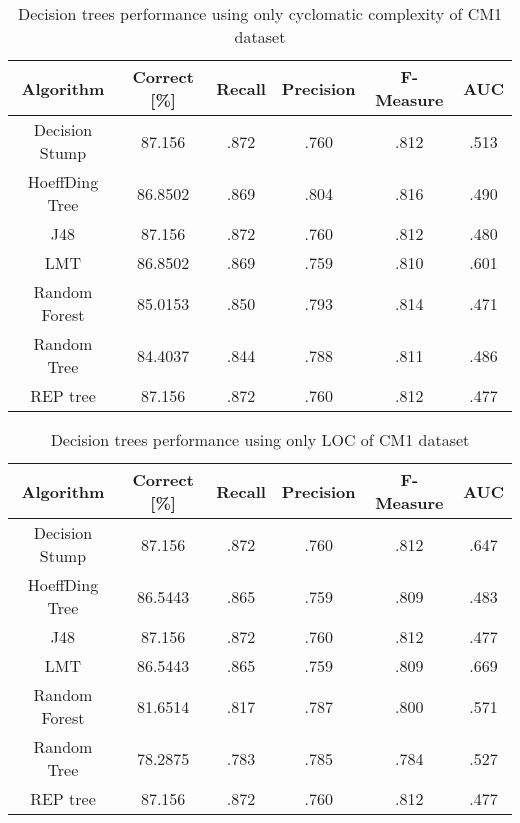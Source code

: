\begin{table}[h!]
\centering
\begin{tabular}{ |c|c|c|c|c|c| } 
 \hline
 \textbf{Algorithm} & \textbf{Correct [\%]} &  \textbf{Recall} & \textbf{Precision} & \textbf{F-Measure} & \textbf{AUC}  \\ 
 \hline
 Decision Stump & \textcolor{myRed}{87.156} & \textcolor{myRed}{.872} & .760 & .812 & .513    \\ 
 \hline
 HoeffDing Tree & 86.8502 & .869 & \textcolor{myRed}{.804} & \textcolor{myRed}{.816} & .490   \\ 
 \hline
  J48 & \textcolor{myRed}{87.156} & \textcolor{myRed}{.872} & .760 & .812 & .480\\ 
 \hline
  LMT & 86.8502 & .869 & .759 & .810 & \textcolor{myRed}{.601}  \\ 
 \hline
  Random Forest & 85.0153 & .850 & .793 & .814 & .471 \\ 
 \hline
  Random Tree & 84.4037 & .844 & .788 & .811 & .486 \\ 
 \hline
 REP tree  & \textcolor{myRed}{87.156} & \textcolor{myRed}{.872} & .760 & .812 & .477 \\ 
 \hline
\end{tabular}
\caption{Decision trees performance using only cyclomatic complexity of CM1 dataset}
\label{table:DT_complexity_CM1}
\end{table}


\begin{table}[h!]
\centering
\begin{tabular}{ |c|c|c|c|c|c| } 
 \hline
 \textbf{Algorithm} & \textbf{Correct [\%]} &  \textbf{Recall} & \textbf{Precision} & \textbf{F-Measure} & \textbf{AUC}  \\ 
 \hline
 Decision Stump & \textcolor{myRed}{87.156}& \textcolor{myRed}{.872} & .760 & .812 & .647    \\ 
 \hline
 HoeffDing Tree & 86.5443 & .865 & .759 & .809 & .483   \\ 
 \hline
  J48 & \textcolor{myRed}{87.156} & \textcolor{myRed}{.872} & .760 & \textcolor{myRed}{.812} & .477\\ 
 \hline
  LMT & 86.5443 & .865 & .759 & .809 & \textcolor{myRed}{.669}  \\ 
 \hline
  Random Forest & 81.6514 & .817 & \textcolor{myRed}{.787} & .800 & .571 \\ 
 \hline
  Random Tree & 78.2875 & .783 & .785 & .784 & .527 \\ 
 \hline
 REP tree  & \textcolor{myRed}{87.156} & \textcolor{myRed}{.872} & .760 & .812 & .477 \\ 
 \hline

\end{tabular}
\caption{Decision trees performance using only LOC of CM1 dataset}
\label{table:DT_LOC_CM1}
\end{table}

